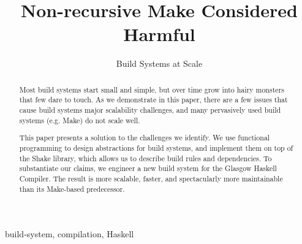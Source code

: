 \documentclass[preprint]{sigplanconf}
\begin{document}
\setlength{\pdfpageheight}{\paperheight}
\setlength{\pdfpagewidth}{\paperwidth}


\title{Non-recursive Make Considered Harmful}
\subtitle{Build Systems at Scale}


\maketitle

\begin{abstract}
Most build systems start small and simple, but over time grow into hairy monsters
that few dare to touch. As we demonstrate in this paper, there are a few issues
that cause build systems major scalability challenges, and many pervasively
used build systems (e.g. Make) do not scale well.

This paper presents a solution to the challenges we identify. We use functional
programming to design abstractions for build systems, and implement
them on top of the Shake library, which allows us to describe build rules and
dependencies. To substantiate our claims, we engineer a new build system
for the Glasgow Haskell Compiler. The result is more scalable, faster, and
spectacularly more maintainable than its Make-based predecessor.
\end{abstract}

\keywords
build-system, compilation, Haskell













\balance

\end{document}
